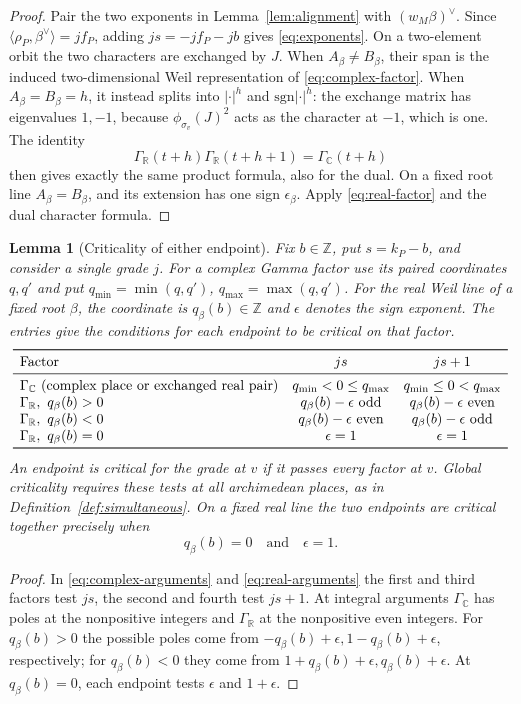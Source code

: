 \documentclass[12pt]{amsart}
\numberwithin{equation}{section}
\theoremstyle{plain}
\newtheorem{lemma}[theorem]{Lemma}
\theoremstyle{definition}
\theoremstyle{remark}
\newcommand{\C}{\mathbb C}
\newcommand{\R}{\mathbb R}
\newcommand{\Z}{\mathbb{Z}}
\newcommand{\sgn}{\mathrm{sgn}}
\begin{document}
\begin{proof}
Pair the two exponents in Lemma~\ref{lem:alignment} with $(w_M\beta)^\vee$. Since $\langle\rho_P,\beta^\vee\rangle=jf_P$, adding $js=-jf_P-jb$ gives \eqref{eq:exponents}. On a two-element orbit the two characters are exchanged by $J$. When $A_\beta\ne B_\beta$, their span is the induced two-dimensional Weil representation of \eqref{eq:complex-factor}. When $A_\beta=B_\beta=h$, it instead splits into $|\cdot|^h$ and $\sgn|\cdot|^h$: the exchange matrix has eigenvalues $1,-1$, because $\phi_{\sigma_v}(J)^2$ acts as the character at $-1$, which is one. The identity 
\[
 \Gamma_\R(t+h)\Gamma_\R(t+h+1)=\Gamma_\C(t+h)
\]
then gives exactly the same product formula, also for the dual. On a fixed root line $A_\beta=B_\beta$, and its extension has one sign $\epsilon_\beta$. Apply \eqref{eq:real-factor} and the dual character formula. 
\end{proof}

\begin{lemma}[Criticality of either endpoint]\label{lem:parity}
Fix $b\in\Z$, put $s=k_P-b$, and consider a single grade $j$. For a complex Gamma factor use its paired coordinates $q,q'$ and put $q_{\min}=\min(q,q')$, $q_{\max}=\max(q,q')$. For the real Weil line of a fixed root $\beta$, the coordinate is $q_\beta(b)\in\Z$ and $\epsilon$ denotes the sign exponent. The entries give the conditions for each endpoint to be critical on that factor. 
\[
\begin{array}{lcc}
\toprule
\text{Factor} & js & js+1\\
\midrule
\Gamma_{\C}\ \text{(complex place or exchanged real pair)}
 & q_{\min}<0\le q_{\max} & q_{\min}\le0<q_{\max}\\
\Gamma_{\R},\ q_\beta(b)>0 & q_\beta(b)-\epsilon\ \text{odd} & q_\beta(b)-\epsilon\ \text{even}\\
\Gamma_{\R},\ q_\beta(b)<0 & q_\beta(b)-\epsilon\ \text{even} & q_\beta(b)-\epsilon\ \text{odd}\\
\Gamma_{\R},\ q_\beta(b)=0 & \epsilon=1 & \epsilon=1\\
\bottomrule
\end{array}
\]
An endpoint is critical for the grade at $v$ if it passes every factor at $v$. Global criticality requires these tests at all archimedean places, as in Definition~\ref{def:simultaneous}. On a fixed real line the two endpoints are critical together precisely when
\begin{equation}\label{eq:parity-condition}
 q_\beta(b)=0\quad\text{and}\quad\epsilon=1 .
\end{equation}
\end{lemma}
\begin{proof}
In \eqref{eq:complex-arguments} and \eqref{eq:real-arguments} the first and third factors test $js$, the second and fourth test $js+1$. At integral arguments $\Gamma_\C$ has poles at the nonpositive integers and $\Gamma_\R$ at the nonpositive even integers. For $q_\beta(b)>0$ the possible poles come from $-q_\beta(b)+\epsilon,1-q_\beta(b)+\epsilon$, respectively; for $q_\beta(b)<0$ they come from $1+q_\beta(b)+\epsilon,q_\beta(b)+\epsilon$. At $q_\beta(b)=0$, each endpoint tests $\epsilon$ and $1+\epsilon$.
\end{proof}
\end{document}
